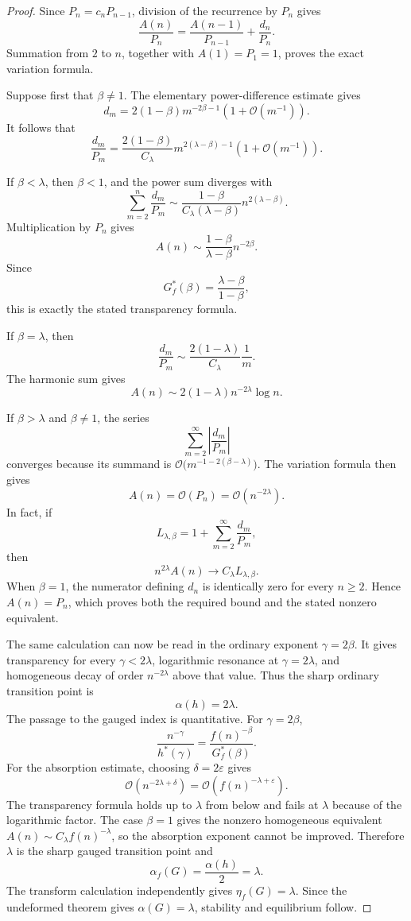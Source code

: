 \documentclass[10pt,a4paper]{amsart}
\newcommand{\eps}{\varepsilon}
\begin{document}
\begin{proof}
Since \(P_n=c_nP_{n-1}\), division of the recurrence by \(P_n\) gives
\[
\frac{A(n)}{P_n}
=\frac{A(n-1)}{P_{n-1}}+\frac{d_n}{P_n}.
\]
Summation from \(2\) to \(n\), together with \(A(1)=P_1=1\), proves the
exact variation formula.

Suppose first that \(\beta\ne1\). The elementary power-difference estimate
gives
\[
d_m
=2(1-\beta)m^{-2\beta-1}
\left(1+\mathcal O(m^{-1})\right).
\]
It follows that
\[
\frac{d_m}{P_m}
=\frac{2(1-\beta)}{C_\lambda}
m^{2(\lambda-\beta)-1}
\left(1+\mathcal O(m^{-1})\right).
\]

If \(\beta<\lambda\), then \(\beta<1\), and the power sum diverges with
\[
\sum_{m=2}^{n}\frac{d_m}{P_m}
\sim
\frac{1-\beta}{C_\lambda(\lambda-\beta)}
n^{2(\lambda-\beta)}.
\]
Multiplication by \(P_n\) gives
\[
A(n)\sim
\frac{1-\beta}{\lambda-\beta}n^{-2\beta}.
\]
Since
\[
G^*_f(\beta)=\frac{\lambda-\beta}{1-\beta},
\]
this is exactly the stated transparency formula.

If \(\beta=\lambda\), then
\[
\frac{d_m}{P_m}
\sim
\frac{2(1-\lambda)}{C_\lambda}\frac1m.
\]
The harmonic sum gives
\[
A(n)\sim2(1-\lambda)n^{-2\lambda}\log n.
\]

If \(\beta>\lambda\) and \(\beta\ne1\), the series
\[
\sum_{m=2}^{\infty}\left|\frac{d_m}{P_m}\right|
\]
converges because its summand is
\(
\mathcal O\bigl(m^{-1-2(\beta-\lambda)}\bigr)
\).
The variation formula then gives
\[
A(n)=\mathcal O(P_n)=\mathcal O(n^{-2\lambda}).
\]
In fact, if
\[
L_{\lambda,\beta}
=1+\sum_{m=2}^{\infty}\frac{d_m}{P_m},
\]
then
\[
n^{2\lambda}A(n)\longrightarrow
C_\lambda L_{\lambda,\beta}.
\]
When \(\beta=1\), the numerator defining \(d_n\) is identically zero for
every \(n\geq2\). Hence \(A(n)=P_n\), which proves both the required bound
and the stated nonzero equivalent.

The same calculation can now be read in the ordinary exponent
\(\gamma=2\beta\). It gives transparency for every \(\gamma<2\lambda\),
logarithmic resonance at \(\gamma=2\lambda\), and homogeneous decay of order
\(n^{-2\lambda}\) above that value. Thus the sharp ordinary transition point
is
\[
\alpha(h)=2\lambda.
\]
The passage to the gauged index is quantitative. For \(\gamma=2\beta\),
\[
\frac{n^{-\gamma}}{h^*(\gamma)}
=\frac{f(n)^{-\beta}}{G^*_f(\beta)}.
\]
For the absorption estimate, choosing \(\delta=2\eps\) gives
\[
\mathcal O(n^{-2\lambda+\delta})
=\mathcal O\!\left(f(n)^{-\lambda+\eps}\right).
\]
The transparency formula holds up to \(\lambda\) from below and fails at
\(\lambda\) because of the logarithmic factor. The case \(\beta=1\) gives
the nonzero homogeneous equivalent
\(A(n)\sim C_\lambda f(n)^{-\lambda}\), so the absorption exponent cannot
be improved. Therefore \(\lambda\) is the sharp gauged transition point and
\[
\alpha_f(G)=\frac{\alpha(h)}2=\lambda.
\]
The transform calculation independently gives \(\eta_f(G)=\lambda\). Since
the undeformed theorem gives \(\alpha(G)=\lambda\), stability and equilibrium
follow.
\end{proof}
\end{document}
